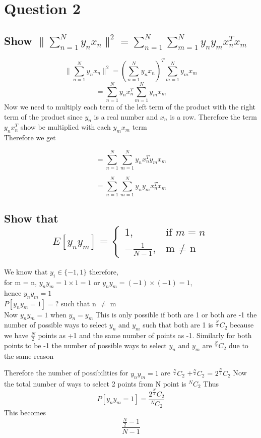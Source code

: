 \documentclass{article}
\begin{document}
\section{Question 2 }
\subsection{Show $\| \sum_{n=1}^{N}y_nx_n\|^2 = \sum_{n=1}^{N}\sum_{m=1}^{N}y_ny_mx_n^Tx_m$}
$$\| \sum_{n=1}^{N}y_nx_n\|^2  = (\sum_{n=1}^{N}y_nx_n)^T\sum_{m=1}^{N}y_mx_m$$
$$  =\sum_{n=1}^{N}y_nx_n^T\sum_{m=1}^{N}y_mx_m $$
Now we need to multiply each term of the left term of the product with the right term of the product 
since $y_n$ is a real number and $x_n$ is a row. Therefore the term $y_nx_n^T$ show be multiplied with each $y_mx_m$ term \\ 
Therefore we get 

$$  =\sum_{n=1}^{N}\sum_{m=1}^{N}y_nx_n^Ty_mx_m $$

$$  =\sum_{n=1}^{N}\sum_{m=1}^{N}y_ny_mx_n^Tx_m $$
\subsection{Show that \[
   E[y_ny_m]= 
\begin{cases}
    1,& \text{if } m = n \\
    -\frac{1}{N-1},              & \text{m $\neq$ n}
\end{cases}
\] }
We know that $y_i \in \{-1,1\}$ therefore,\\
for m = n, $y_ny_m = 1\times1 = 1$ or $y_ny_m = (-1)\times(-1) = 1$,\\
hence $y_ny_m = 1$\\
$P[y_ny_m = 1] =  ?$ such that n $\neq$ m\\ 
Now $y_ny_m = 1$ when  $y_n = y_m $ This is only possible if both are 1 or both are -1
the number of possible ways to select $y_n$ and $y_m$ such that both are 1 is 
$^{\frac{N}{2}}C_2$ because we have $\frac{N}{2} $ points as +1 and the same number of points as -1. Similarly for both points to be -1 the number of possible ways to select $y_n$ and $y_m$ are $^{\frac{N}{2}}C_2$  due to the same reason 

Therefore the number of possibilities for $y_ny_m = 1$ are $^{\frac{N}{2}}C_2 $ +$^{\frac{N}{2}}C_2$  = $2^{\frac{N}{2}}C_2$    
Now the total number of ways to select 2 points from N point is $^NC_2$ 
Thus 
$$P[y_ny_m = 1] = \frac{2^{\frac{N}{2}}C_2}{^NC_2} $$
This becomes 
$$\frac{\frac{N}{2} - 1 }{N-1}$$ 
\end{document}
